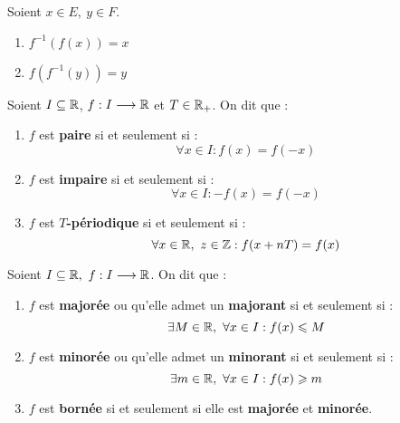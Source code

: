 \begin{proposition}
	Soient $x \in E,\ y \in F$.
    \begin{multicols}{2}
        \begin{enumerate}
            \item $f^{-1} (f(x)) = x$
            \item $f(f^{-1}(y)) = y$
        \end{enumerate}
    \end{multicols}
\end{proposition}

\begin{definition}
	Soient $I \subseteq \mathbb{R}$, $f : I \longrightarrow \mathbb{R}$ et $T \in \mathbb{R}_+$. On dit que :
    \begin{enumerate}
        \item $f$ est \textbf{paire} si et seulement si : 
        \[ \forall x \in I : f(x) = f(-x) \]
        \item $f$ est \textbf{impaire} si et seulement si  :
        \[ \forall x \in I : -f(x) = f(-x) \]
        \item $f$ est \textbf{$T$-périodique} si et seulement si :
        \[ \forall x \in \mathbb{R},\ z \in \mathbb{Z} : f(x + nT) = f(x) \]
    \end{enumerate}
\end{definition}

\begin{definition}
	Soient $I \subseteq \mathbb{R},\ f : I \longrightarrow \mathbb{R}$. On dit que :
	\begin{enumerate}
	    \item $f$ est \textbf{majorée} ou qu'elle admet un \textbf{majorant} si et seulement si : 
	    \[ \exists M \in \mathbb{R},\ \forall x \in I : f(x) \leqslant M \]
        \item $f$ est \textbf{minorée} ou qu'elle admet un \textbf{minorant} si et seulement si :
        \[ \exists m \in \mathbb{R},\ \forall x \in I : f(x) \geqslant m \]
        \item $f$ est \textbf{bornée} si et seulement si elle est \textbf{majorée} et \textbf{minorée}.
	\end{enumerate}
\end{definition}

